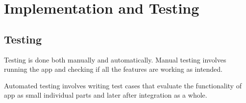 \documentclass[../Report.tex]{subfiles}
\begin{document}
\chapter{Implementation and Testing} \label{chap:imp_test}







\section{Testing}

Testing is done both manually and automatically. Manual testing involves running the app and checking if all the features are working as 
intended.\par
Automated testing involves writing test cases that evaluate the functionality of app as small individual parts and later after integration 
as a whole.


\end{document}
